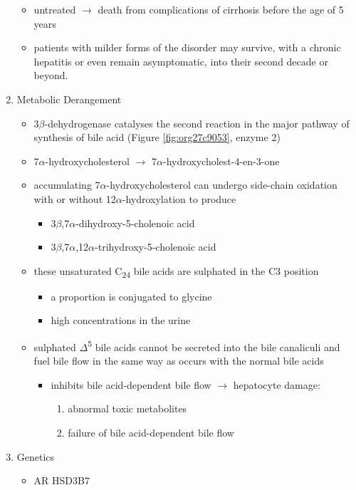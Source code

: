 \documentclass[12pt]{scrartcl}
\begin{document}
\begin{enumerate}
\begin{itemize}
\item untreated \(\to\) death from complications of cirrhosis before the age
of 5 years
\item patients with milder forms of the disorder may survive, with a
chronic hepatitis or even remain asymptomatic, into their second
decade or beyond.
\end{itemize}
\item Metabolic Derangement
\label{sec:org3ae7ba0}
\begin{itemize}
\item 3\(\beta\)-dehydrogenase catalyses the second reaction in the major
pathway of synthesis of bile acid (Figure \ref{fig:org27c9053}, enzyme 2)
\item 7\(\alpha\)-hydroxycholesterol \(\to\) 7\(\alpha\)-hydroxycholest-4-en-3-one
\item accumulating 7\(\alpha\)-hydroxycholesterol can undergo side-chain
oxidation with or without 12\(\alpha\)-hydroxylation to produce
\begin{itemize}
\item 3\(\beta\),7\(\alpha\)-dihydroxy-5-cholenoic acid
\item 3\(\beta\),7\(\alpha\),12\(\alpha\)-trihydroxy-5-cholenoic acid
\end{itemize}
\item these unsaturated C\textsubscript{24} bile acids are sulphated in the C3 position
\begin{itemize}
\item a proportion is conjugated to glycine
\item high concentrations in the urine
\end{itemize}
\item sulphated \(\Delta\)\textsuperscript{5} bile acids cannot be secreted into the bile
canaliculi and fuel bile flow in the same way as occurs with the
normal bile acids
\begin{itemize}
\item inhibits bile acid-dependent bile flow \(\to\) hepatocyte damage:
\begin{enumerate}
\item abnormal toxic metabolites
\item failure of bile acid-dependent bile flow
\end{enumerate}
\end{itemize}
\end{itemize}

\item Genetics
\label{sec:org915312f}
\begin{itemize}
\item AR HSD3B7
\end{itemize}


\end{enumerate}
\end{document}
